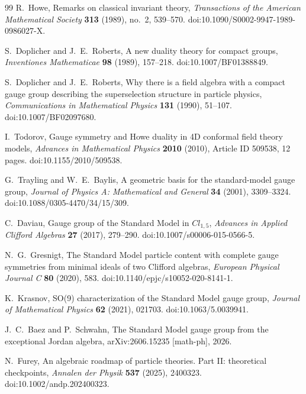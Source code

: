 \documentclass[11pt]{article}
\numberwithin{equation}{section}
\theoremstyle{definition}
\theoremstyle{remark}
\begin{document}
\begin{thebibliography}{99}
R.~Howe,
\newblock Remarks on classical invariant theory,
\newblock \emph{Transactions of the American Mathematical Society}
\textbf{313} (1989), no.~2, 539--570.
\newblock doi:10.1090/S0002-9947-1989-0986027-X.

S.~Doplicher and J.~E.~Roberts,
\newblock A new duality theory for compact groups,
\newblock \emph{Inventiones Mathematicae} \textbf{98} (1989), 157--218.
\newblock doi:10.1007/BF01388849.

S.~Doplicher and J.~E.~Roberts,
\newblock Why there is a field algebra with a compact gauge group describing
the superselection structure in particle physics,
\newblock \emph{Communications in Mathematical Physics} \textbf{131} (1990),
51--107.
\newblock doi:10.1007/BF02097680.

I.~Todorov,
\newblock Gauge symmetry and Howe duality in 4D conformal field theory models,
\newblock \emph{Advances in Mathematical Physics} \textbf{2010} (2010),
Article ID 509538, 12 pages.
\newblock doi:10.1155/2010/509538.

G.~Trayling and W.~E.~Baylis,
\newblock A geometric basis for the standard-model gauge group,
\newblock \emph{Journal of Physics A: Mathematical and General} \textbf{34} (2001),
3309--3324.
\newblock doi:10.1088/0305-4470/34/15/309.

C.~Daviau,
\newblock Gauge group of the Standard Model in $Cl_{1,5}$,
\newblock \emph{Advances in Applied Clifford Algebras} \textbf{27} (2017), 279--290.
\newblock doi:10.1007/s00006-015-0566-5.

N.~G.~Gresnigt,
\newblock The Standard Model particle content with complete gauge symmetries from
minimal ideals of two Clifford algebras,
\newblock \emph{European Physical Journal C} \textbf{80} (2020), 583.
\newblock doi:10.1140/epjc/s10052-020-8141-1.

K.~Krasnov,
\newblock SO(9) characterization of the Standard Model gauge group,
\newblock \emph{Journal of Mathematical Physics} \textbf{62} (2021), 021703.
\newblock doi:10.1063/5.0039941.

J.~C.~Baez and P.~Schwahn,
\newblock The Standard Model gauge group from the exceptional Jordan algebra,
\newblock arXiv:2606.15235 [math-ph], 2026.

N.~Furey,
\newblock An algebraic roadmap of particle theories. Part II: theoretical checkpoints,
\newblock \emph{Annalen der Physik} \textbf{537} (2025), 2400323.
\newblock doi:10.1002/andp.202400323.


\end{thebibliography}
\end{document}
